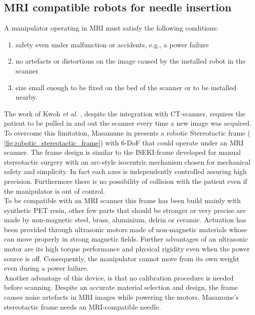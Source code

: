 \subsection{MRI compatible robots for needle insertion}
A manipulator operating in MRI must satisfy the following conditions:
\begin{enumerate}
	\item safety even under malfunction or accidents, e.g., a power failure
	\item no artefacts or distortions on the image caused by the installed robot in the scanner
	\item size small enough to be fixed on the bed of the scanner or to be installed nearby.
\end{enumerate}
The work of Kwoh \textit{et al.} \cite{Kwoh1988}, despite the integration with CT-scanner, requires the patient to be pulled in and out the scanner every time a new image was acquired.
To overcome this limitation, Masamune in \cite{Masamune1995} presents a robotic Stereotactic frame (\figurename{ \ref{fig:robotic_stereotactic_frame}}) with 6-DoF that could operate under an MRI scanner.
The frame design is similar to the ISEKI-frame developed for manual stereotactic surgery with an arc-style isocentric mechanism chosen for mechanical safety and simplicity. In fact each axes is independently controlled assuring high precision. Furthermore there is no possibility of collision with the patient even if the manipulator is out of control.\\
To be compatible with an MRI scanner this frame has been build mainly with synthetic PET resin, other few parts that should be stronger or very precise are made by non-magnetic steel, brass, aluminium, delrin or ceramic.
Actuation has been provided through ultrasonic motors made of non-magnetic materials whose can move properly in strong magnetic fields.
Further advantages of an ultrasonic motor are its high torque performance and physical rigidity even when the power source is off. Consequently, the manipulator cannot move from its own weight even during a power failure.\\
Another advantage of this device, is that no calibration procedure is needed before scanning.
Despite an accurate material selection and design, the frame causes noise artefacts in MRI images while powering the motors.
Masamune's stereotactic frame needs an MRI-compatible needle.\\
